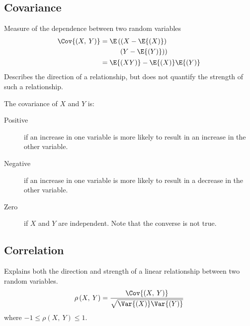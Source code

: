 \documentclass{article}
\begin{document}
\begin{multicols}{3}
    \subsection{Covariance}
    Measure of the dependence between two random variables
    \begin{align*}
        \Cov{\left( X,\: Y \right)} & = \begin{aligned}[t]
                                            \E\left( \left( X - \E{\left( X \right)} \right) \right. & \\
                                            \left. \left( Y - \E{\left( Y \right)} \right) \right)   &
                                        \end{aligned}                        \\
                                    & = \E{\left( XY \right)} - \E{\left( X \right)} \E{\left( Y \right)}
    \end{align*}
    Describes the direction of a relationship, but does not quantify the strength of such a relationship.
    \columnbreak
    
    The covariance of \(X\) and \(Y\) is:
    \begin{description}
        \item[Positive] if an increase in one variable is more likely to result in an increase in
            the other variable.
        \item[Negative] if an increase in one variable is more likely to result in a decrease in
            the other variable.
        \item[Zero] if \(X\) and \(Y\) are independent. Note that the converse is not true.
    \end{description}
    \subsection{Correlation}
    Explains both the direction and strength of a linear relationship between two random variables.
    \begin{equation*}
        \rho\left( X,\: Y \right) = \frac{\Cov{\left( X,\: Y \right)}}{\sqrt{\Var{\left( X \right)} \Var{\left( Y \right)}}}
    \end{equation*}
    where \(-1 \leq \rho\left( X,\: Y \right) \leq 1\).
    \columnbreak


\end{multicols}
\end{document}
